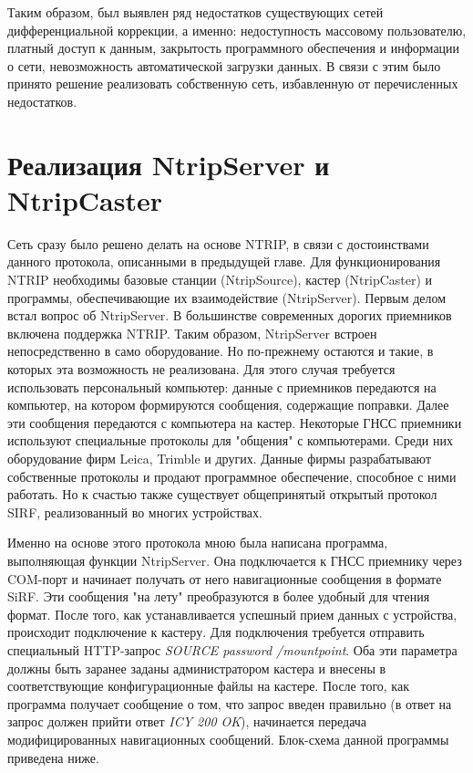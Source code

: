\documentclass[a4paper,12pt]{report}
\begin{document}
\par Таким образом, был выявлен ряд недостатков существующих сетей дифференциальной коррекции, а именно: недоступность массовому пользователю, 
платный доступ к данным, закрытость программного обеспечения и информации о сети, невозможность автоматической загрузки данных. В связи с этим 
было принято решение реализовать собственную сеть, избавленную от перечисленных недостатков.

\section{Реализация NtripServer и NtripCaster}
\par Сеть сразу было решено делать на основе NTRIP, в связи с достоинствами данного протокола, описанными в предыдущей главе. Для функционирования
NTRIP необходимы базовые станции (NtripSource), кастер (NtripCaster) и программы, обеспечивающие их взаимодействие (NtripServer).
Первым делом встал вопрос об NtripServer. В большинстве современных дорогих приемников включена поддержка NTRIP. Таким образом, NtripServer встроен 
непосредственно в само оборудование. Но по-прежнему остаются и такие, в которых эта возможность не реализована. Для этого случая требуется 
использовать персональный компьютер: данные с приемников передаются на компьютер, на котором формируются сообщения, содержащие поправки. 
Далее эти сообщения передаются с компьютера на кастер. Некоторые ГНСС приемники используют специальные протоколы для "общения" с компьютерами. 
Среди них оборудование фирм Leica, Trimble и других. Данные фирмы разрабатывают собственные протоколы и продают программное обеспечение, 
способное с ними работать. Но к счастью также существует общепринятый открытый протокол SIRF, реализованный во многих устройствах. \par
Именно на основе этого протокола мною была написана программа, выполняющая функции NtripServer. Она подключается к ГНСС приемнику через 
COM-порт и начинает получать от него навигационные сообщения в формате SiRF. Эти сообщения "на лету" преобразуются в более удобный для чтения 
формат. После того, как устанавливается успешный прием данных с устройства, происходит подключение к кастеру. Для подключения требуется отправить 
специальный HTTP-запрос {\it SOURCE password /mountpoint}. Оба эти параметра должны быть заранее заданы администратором кастера и внесены в 
соответствующие конфигурационные файлы на кастере. После того, как программа получает сообщение о том, что запрос введен правильно (в ответ на 
запрос должен прийти ответ {\it ICY 200 OK}), начинается передача модифицированных навигационных сообщений. Блок-схема данной программы приведена 
ниже.
\end{document}
